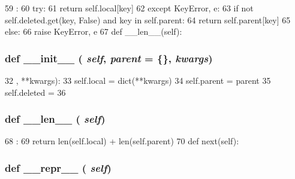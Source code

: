\begin{DoxyCode}
59                               :
60         try:
61             return self.local[key]
62         except KeyError, e:
63             if not self.deleted.get(key, False) and key in self.parent:
64                 return self.parent[key]
65             else:
66                 raise KeyError, e
67 
    def __len__(self):
\end{DoxyCode}
\hypertarget{classm5_1_1util_1_1multidict_1_1multidict_ac775ee34451fdfa742b318538164070e}{
\subsubsection[{\_\-\_\-init\_\-\_\-}]{\setlength{\rightskip}{0pt plus 5cm}def \_\-\_\-init\_\-\_\- ( {\em self}, \/   {\em parent} = {\ttfamily \{\}}, \/   {\em kwargs})}}
\label{classm5_1_1util_1_1multidict_1_1multidict_ac775ee34451fdfa742b318538164070e}



\begin{DoxyCode}
32                                 {}, **kwargs):
33         self.local = dict(**kwargs)
34         self.parent = parent
35         self.deleted = {}
36 
\end{DoxyCode}
\hypertarget{classm5_1_1util_1_1multidict_1_1multidict_af6412d48d9a71eac81e3195b52455aaa}{
\subsubsection[{\_\-\_\-len\_\-\_\-}]{\setlength{\rightskip}{0pt plus 5cm}def \_\-\_\-len\_\-\_\- ( {\em self})}}
\label{classm5_1_1util_1_1multidict_1_1multidict_af6412d48d9a71eac81e3195b52455aaa}



\begin{DoxyCode}
68                      :
69         return len(self.local) + len(self.parent)
70 
    def next(self):
\end{DoxyCode}
\hypertarget{classm5_1_1util_1_1multidict_1_1multidict_ad8b9328939df072e4740cd9a63189744}{
\subsubsection[{\_\-\_\-repr\_\-\_\-}]{\setlength{\rightskip}{0pt plus 5cm}def \_\-\_\-repr\_\-\_\- ( {\em self})}}
\label{classm5_1_1util_1_1multidict_1_1multidict_ad8b9328939df072e4740cd9a63189744}



